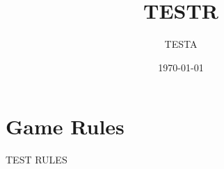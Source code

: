 \documentclass{article}%
\title{TESTR}%
\author{TESTA}%
\date{\today}%
\begin{document}
%
\normalsize%
\maketitle%
\section{Game Rules}%
\label{sec:GameRules}%
TEST RULES

%
\end{document}
